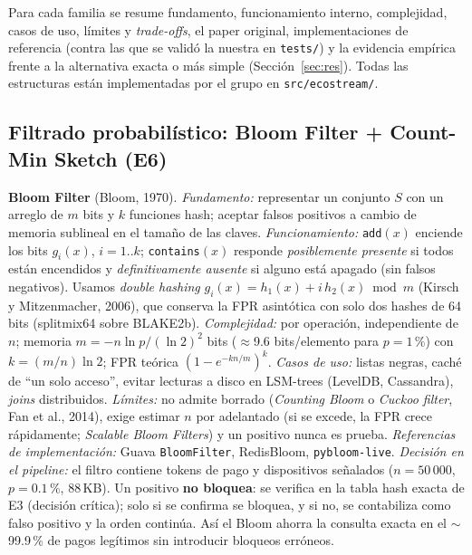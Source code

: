Para cada familia se resume fundamento, funcionamiento interno, complejidad, casos de uso, límites y \emph{trade-offs}, el paper original,
implementaciones de referencia (contra las que se validó la nuestra en \texttt{tests/}) y la evidencia empírica frente a la alternativa exacta o
más simple (Sección~\ref{sec:res}). Todas las estructuras están implementadas por el grupo en \texttt{src/ecostream/}.

\subsection{Filtrado probabilístico: Bloom Filter + Count-Min Sketch (E6)}
\textbf{Bloom Filter} (Bloom, 1970). \emph{Fundamento:} representar un conjunto $S$ con un arreglo de $m$ bits y $k$ funciones hash; aceptar
falsos positivos a cambio de memoria sublineal en el tamaño de las claves. \emph{Funcionamiento:} \texttt{add}$(x)$ enciende los bits
$g_i(x)$, $i=1..k$; \texttt{contains}$(x)$ responde \emph{posiblemente presente} si todos están encendidos y \emph{definitivamente ausente}
si alguno está apagado (sin falsos negativos). Usamos \emph{double hashing} $g_i(x)=h_1(x)+i\,h_2(x) \bmod m$ (Kirsch y Mitzenmacher, 2006),
que conserva la FPR asintótica con solo dos hashes de 64 bits (splitmix64 sobre BLAKE2b). \emph{Complejidad:}  por operación, independiente de
$n$; memoria $m=-n\ln p/(\ln 2)^2$ bits ($\approx$9.6 bits/elemento para $p=1\,\%$) con $k=(m/n)\ln 2$; FPR teórica $(1-e^{-kn/m})^k$.
\emph{Casos de uso:} listas negras, caché de “un solo acceso”, evitar lecturas a disco en LSM-trees (LevelDB, Cassandra), \emph{joins} distribuidos.
\emph{Límites:} no admite borrado (\emph{Counting Bloom} o \emph{Cuckoo filter}, Fan et al., 2014), exige estimar $n$ por adelantado (si se excede,
la FPR crece rápidamente; \emph{Scalable Bloom Filters}) y un positivo nunca es prueba. \emph{Referencias de implementación:} Guava \texttt{BloomFilter},
RedisBloom, \texttt{pybloom-live}.
\emph{Decisión en el pipeline:} el filtro contiene tokens de pago y dispositivos señalados ($n=50\,000$, $p=0.1\,\%$, 88\,KB). Un positivo
\textbf{no bloquea}: se verifica en la tabla hash exacta de E3 (decisión crítica); solo si se confirma se bloquea, y si no, se contabiliza como
falso positivo y la orden continúa. Así el Bloom ahorra la consulta exacta en el $\sim$99.9\,\% de pagos legítimos sin introducir bloqueos erróneos.

